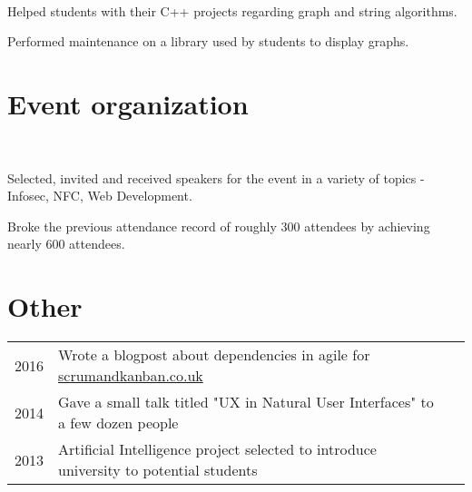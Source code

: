 \documentclass[letterpaper]{deedy-resume} %
\begin{document}
\begin{minipage}[t]{0.66\textwidth}
\sectionspace %


 \\

\begin{tightitemize}
\item Helped students with their C++ projects regarding graph and string algorithms.
\item Performed maintenance on a library used by students to display graphs.
\end{tightitemize}

\sectionspace %


\section{Event organization}

 \\

\begin{tightitemize}
\item Selected, invited and received speakers for the event in a variety of topics - Infosec, NFC, Web Development.
\item Broke the previous attendance record of roughly 300 attendees by achieving nearly 600 attendees.
\end{tightitemize}

\sectionspace %


\section{Other}

\begin{tabular}{rll}
2016 & Wrote a blogpost about dependencies in agile for \href{http://scrumandkanban.co.uk/how-to-deal-with-dependencies/}{scrumandkanban.co.uk} \\
2014 & Gave a small talk titled "UX in Natural User Interfaces" to a few dozen people \\
2013 & Artificial Intelligence project selected to introduce university to potential students
\end{tabular}

\sectionspace %

\end{minipage} %
\end{document}
